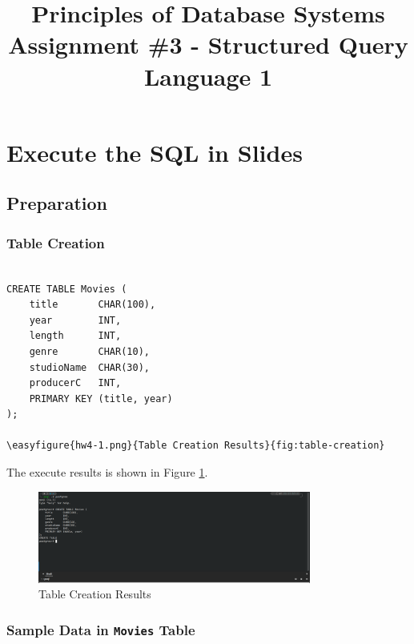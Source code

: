 \documentclass{cshwk}
\title{Principles of Database Systems\\Assignment \#3 - Structured Query Language 1}
\begin{document}
\maketitle

\section{Execute the SQL in Slides}

\subsection{Preparation}

\subsubsection{Table Creation}

\begin{lstlisting}

CREATE TABLE Movies (
    title       CHAR(100),
    year        INT,
    length      INT,
    genre       CHAR(10),
    studioName  CHAR(30),
    producerC   INT,
    PRIMARY KEY (title, year)
);

\easyfigure{hw4-1.png}{Table Creation Results}{fig:table-creation}

\end{lstlisting}

The execute results is shown in Figure \ref{fig:table-creation}.
\begin{figure}[htbp]
    \centering
    \includegraphics[width=0.8\textwidth]{hw4-1.png}
    \caption{Table Creation Results}
    \label{fig:table-creation}
\end{figure}

\subsubsection{Sample Data in \texttt{Movies} Table}
\end{document}
